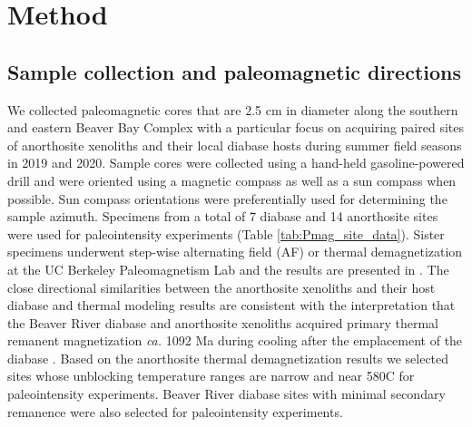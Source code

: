 \documentclass[draft]{agujournal2019}
\begin{document}


\section*{Method}

\subsection*{Sample collection and paleomagnetic directions}

We collected paleomagnetic cores that are 2.5 cm in diameter along the southern and eastern Beaver Bay Complex with a particular focus on acquiring paired sites of anorthosite xenoliths and their local diabase hosts during summer field seasons in 2019 and 2020. Sample cores were collected using a hand-held gasoline-powered drill and were oriented using a magnetic compass as well as a sun compass when possible. Sun compass orientations were preferentially used for determining the sample azimuth. Specimens from a total of 7 diabase and 14 anorthosite sites were used for paleointensity experiments (Table \ref{tab:Pmag_site_data}). Sister specimens underwent step-wise alternating field (AF) or thermal demagnetization at the UC Berkeley Paleomagnetism Lab and the results are presented in . The close directional similarities between the anorthosite xenoliths and their host diabase and thermal modeling results are consistent with the interpretation that the Beaver River diabase and anorthosite xenoliths acquired primary thermal remanent magnetization \textit{ca.} 1092 Ma during cooling after the emplacement of the diabase \cite{Zhang2021b}. Based on the anorthosite thermal demagnetization results we selected sites whose unblocking temperature ranges are narrow and near 580\textdegree C for paleointensity experiments. Beaver River diabase sites with minimal secondary remanence were also selected for paleointensity experiments.
\end{document}
